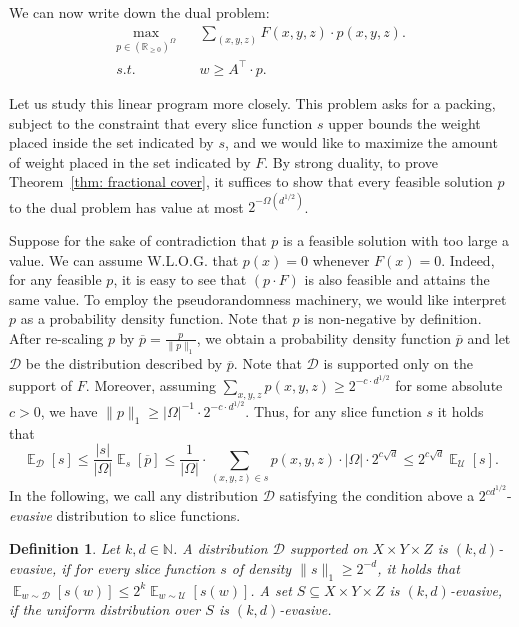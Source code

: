\documentclass[11pt]{article}
\newtheorem{definition}[theorem]{Definition}
\DeclareMathOperator*{\E}{\mathbb{E}}
\newcommand{\1}{ \mathbbm{1}}
\begin{document}
We can now write down the dual problem:
$$
\begin{aligned}
\max_{p\in (\mathbb{R}_{\ge 0})^{\Omega}} ~~~~ &\sum_{(x,y,z)} F(x,y,z)\cdot p(x,y,z). \\
s.t. ~~~~ & w \ge A^\top \cdot p.
\end{aligned}
$$

Let us study this linear program more closely. This problem asks for a packing, subject to the constraint that every slice function $s$ upper bounds the weight placed inside the set indicated by $s$, and we would like to maximize the amount of weight placed in the set indicated by $F$. By strong duality, to prove Theorem~\ref{thm: fractional cover}, it suffices to show that every feasible solution $p$ to the dual problem has value at most $2^{-\Omega(d^{1/2})}$.

Suppose for the sake of contradiction that $p$ is a feasible solution with too large a value. We can assume W.L.O.G. that $p(x) = 0$ whenever $F(x) = 0$. Indeed, for any feasible $p$, it is easy to see that $(p\cdot F)$ is also feasible and attains the same value. To employ the pseudorandomness machinery, we would like interpret $p$ as a probability density function. 
Note that $p$ is non-negative by definition. After re-scaling $p$ by $\overline{p}=\frac{p}{\|p\|_1}$, we obtain a probability density function $\overline{p}$ and let $\mathcal{D}$ be the distribution described by $\overline{p}$.
Note that $\mathcal{D}$ is supported only on the support of $F$. Moreover, assuming $\sum_{x,y,z}p(x,y,z) \ge 2^{-c\cdot d^{1/2}}$ for some absolute $c > 0$, we have $\|p\|_1\ge |\Omega|^{-1}\cdot 2^{-c\cdot d^{1/2}}$. Thus, for any slice function $s$ it holds that
$$
\E_{\mathcal{D}}[s] \le\frac{|s|}{|\Omega|} \E_{s}[\overline{p}] \le \frac{1}{|\Omega|} \cdot \sum_{(x,y,z)\in s}p(x,y,z)\cdot |\Omega|\cdot 2^{c\sqrt{d}} \le 2^{c\sqrt{d}}\E_{\mathcal{U}}[s].
$$
In the following, we call any distribution $\mathcal{D}$ satisfying the condition above a $2^{c{d^{1/2}}}$-\emph{evasive} distribution to slice functions.

\begin{definition}\label{def: evasive distributions}
Let $k,d\in \mathbb{N}$. A distribution $\mathcal{D}$ supported on $X\times Y\times Z$ is $(k,d)$-evasive, if for every slice function $s$ of density $\|s\|_1 \ge 2^{-d}$, it holds that $\E_{w\sim \mathcal{D}}[s(w)] \le 2^{k} \E_{w\sim \mathcal{U}}[s(w)]$. A set $S\subseteq X\times Y\times Z$ is $(k,d)$-evasive, if the uniform distribution over $S$ is $(k,d)$-evasive.
\end{definition}
\end{document}
